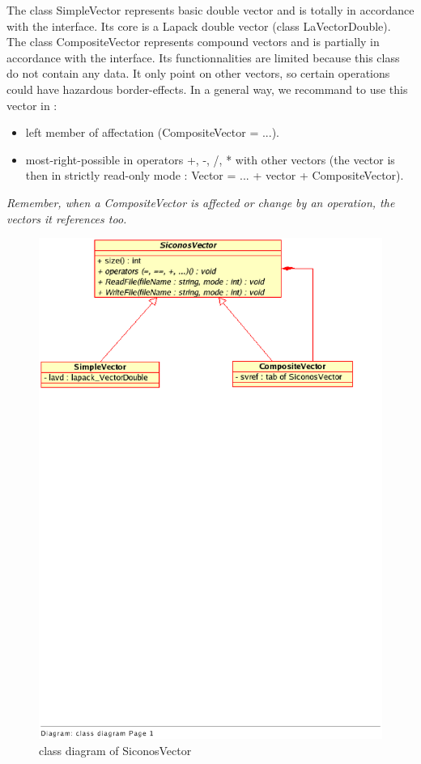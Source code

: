 The class SimpleVector represents basic double vector and is totally in accordance with the interface. Its core is a Lapack double vector (class LaVectorDouble). \\

The class CompositeVector represents compound vectors and is partially in accordance with the interface. Its functionnalities are limited because this class do not contain any data. It only point on other vectors, so certain operations could have hazardous border-effects. In a general way, we recommand to use this vector in :

\begin{itemize}
	\item	left member of affectation (CompositeVector = ...).\\
	
	\item	most-right-possible in operators +, -, /, * with other vectors (the vector is then in strictly read-only mode : Vector = 		... + vector + CompositeVector).
\end{itemize}

\textit{Remember, when a CompositeVector is affected or change by an operation, the vectors it references too.} \\

\begin{figure}[h]
\begin{center}
\includegraphics[scale=0.75, bb=20 570 530 830, clip]{figure/SiconosVector.ps}
\caption{class diagram of SiconosVector}
\label{fig: class diagram of SiconosVector}
\end{center}
\end{figure}
